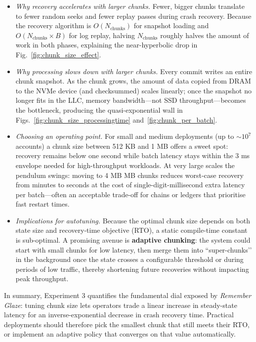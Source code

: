 \documentclass[conference]{IEEEtran}
\begin{document}
\begin{itemize}
  \item \emph{Why recovery accelerates with larger chunks.}  
        Fewer, bigger chunks translate to fewer random seeks and fewer replay
        passes during crash recovery.  Because the recovery algorithm is
        \(O(N_{\text{chunks}})\) for snapshot loading and
        \(O(N_{\text{chunks}}\!\times\!B)\) for log replay, halving
        \(N_{\text{chunks}}\) roughly halves the amount of work in both phases,
        explaining the near-hyperbolic drop in Fig.~\ref{fig:chunk_size_effect}.
  \item \emph{Why processing slows down with larger chunks.}
        Every commit writes an entire chunk snapshot.  As the chunk grows, the
        amount of data copied from DRAM to the NVMe device (and checksummed)
        scales linearly; once the snapshot no longer fits in the LLC, memory
        bandwidth—not SSD throughput—becomes the bottleneck, producing the
        quasi-exponential wall in Figs.~\ref{fig:chunk_size_processingtime}
        and~\ref{fig:chunk_per_batch}.
  \item \emph{Choosing an operating point.}
        For small and medium deployments (up to \(\sim\!10^{7}\) accounts) a
        chunk size between 512 KB and 1 MB offers a
        sweet spot: recovery remains below one second while batch latency
        stays within the 3 ms envelope needed for
        high-throughput workloads.  
        At very large scales the pendulum swings: moving to
        4 MB  MB chunks reduces worst-case
        recovery from minutes to seconds at the cost of single-digit-millisecond
        extra latency per batch—often an acceptable trade-off for chains or
        ledgers that prioritise fast restart times.
  \item \emph{Implications for autotuning.}
        Because the optimal chunk size depends on both state size and
        recovery-time objective (RTO), a static compile-time constant is
        sub-optimal.  A promising avenue is \textbf{adaptive chunking}: the
        system could start with small chunks for low latency, then merge them
        into “super-chunks’’ in the background once the state crosses a
        configurable threshold or during periods of low traffic, thereby
        shortening future recoveries without impacting peak throughput.
\end{itemize}

In summary, Experiment 3 quantifies the fundamental dial exposed by
\textit{Remember Glaze}: tuning chunk size lets operators trade a linear
increase in steady-state latency for an inverse-exponential decrease in crash
recovery time.  Practical deployments should therefore pick the smallest chunk
that still meets their RTO, or implement an adaptive policy that converges on
that value automatically.
\end{document}
